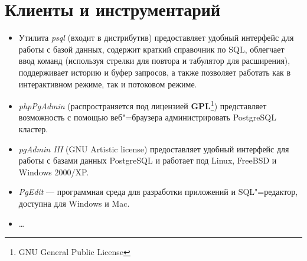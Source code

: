 \documentclass[a4paper,12pt,notitlepage,headsepline,pdftex]{scrartcl}
\begin{document}
\section{Клиенты и инструментарий}
  \begin{itemize}
    \item Утилита \emph{psql} (входит в дистрибутив) предоставляет удобный
      интерфейс для работы с базой данных, содержит краткий справочник по SQL,
      облегчает ввод команд (используя стрелки для повтора и табулятор для
      расширения), поддерживает историю и буфер запросов, а также позволяет
      работать как в интерактивном режиме, так и потоковом режиме.
    \item \emph{phpPgAdmin} (распространяется под лицензией
      \textbf{GPL}\footnote{GNU General Public License}) представляет
      возможность с помощью веб"=браузера администрировать PostgreSQL кластер.
    \item \emph{pgAdmin III} (GNU Artistic license) предоставляет удобный
      интерфейс для работы с базами данных PostgreSQL и работает под Linux,
      FreeBSD и Windows 2000/XP.
    \item \emph{PgEdit} --- программная среда для разработки приложений и
      SQL"=редактор, доступна для Windows и Mac.
    \item \ldots
  \end{itemize}\cite{wtfispg}
  \pagebreak



\end{document}
